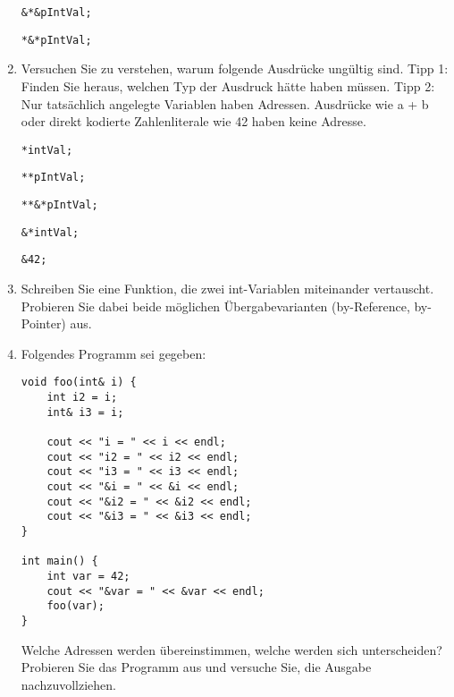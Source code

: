 \documentclass[
  accentcolor=tud1c,	%
  colorbacktitle,		%
  inverttitle,			%
  german,				%
  twoside
]{tudexercise}
\begin{document}
\begin{enumerate}
\begin{lstlisting}
&*&pIntVal;
\end{lstlisting}

\begin{lstlisting}
*&*pIntVal;
\end{lstlisting}


\item Versuchen Sie zu verstehen, warum folgende Ausdrücke ungültig sind. Tipp 1: Finden Sie heraus, welchen Typ der Ausdruck hätte haben müssen. Tipp 2: Nur tatsächlich angelegte Variablen haben Adressen. Ausdrücke wie a + b oder direkt kodierte Zahlenliterale wie 42 haben keine Adresse.

\begin{lstlisting}
*intVal;
\end{lstlisting}

\begin{lstlisting}
**pIntVal;
\end{lstlisting}

\begin{lstlisting}
**&*pIntVal;
\end{lstlisting}

\begin{lstlisting}
&*intVal;
\end{lstlisting}

\begin{lstlisting}
&42;
\end{lstlisting}

\item Schreiben Sie eine Funktion, die zwei int-Variablen miteinander vertauscht. Probieren Sie dabei beide möglichen Übergabevarianten (by-Reference, by-Pointer) aus. 

\item Folgendes Programm sei gegeben:\\

\begin{minipage}{\textwidth}
\begin{lstlisting}
void foo(int& i) {
	int i2 = i;
	int& i3 = i;
	
	cout << "i = " << i << endl;
	cout << "i2 = " << i2 << endl;
	cout << "i3 = " << i3 << endl;
	cout << "&i = " << &i << endl;
	cout << "&i2 = " << &i2 << endl;
	cout << "&i3 = " << &i3 << endl;
}

int main() {
	int var = 42;
	cout << "&var = " << &var << endl;
	foo(var);
}
\end{lstlisting}
\end{minipage}

Welche Adressen werden übereinstimmen, welche werden sich unterscheiden? Probieren Sie das Programm aus und versuche Sie, die Ausgabe nachzuvollziehen.

\end{enumerate}
\end{document}

